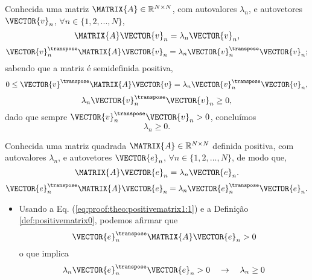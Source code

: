 \begin{myproofT}\label{proof:theo:semipositivematrix2}
Conhecida uma matriz $\MATRIX{A} \in \mathbb{R}^{N \times N}$, com  autovalores $\lambda_n$,
e autovetores $\VECTOR{v}_n$, $\forall n \in \{1, 2, ..., N\}$,
\begin{equation}
\MATRIX{A}\VECTOR{v}_n = \lambda_n \VECTOR{v}_n, 
\end{equation}
\begin{equation}
\VECTOR{v}_n^{\transpose}\MATRIX{A}\VECTOR{v}_n = \lambda_n \VECTOR{v}_n^{\transpose}\VECTOR{v}_n;
\end{equation}
sabendo que a matriz é semidefinida positiva,
\begin{equation}
0 \leq \VECTOR{v}^{\transpose}\MATRIX{A}\VECTOR{v} = \lambda_n \VECTOR{v}_n^{\transpose}\VECTOR{v}_n,
\end{equation}
\begin{equation}
\lambda_n \VECTOR{v}_n^{\transpose}\VECTOR{v}_n \geq 0,
\end{equation}
dado que sempre $\VECTOR{v}_n^{\transpose}\VECTOR{v}_n> 0$, concluímos
\begin{equation}
\lambda_n  \geq 0.
\end{equation} 
\end{myproofT}

\begin{myproofT}\label{proof:theo:positivematrix1}
Conhecida uma matriz quadrada $\MATRIX{A} \in \mathbb{R}^{N \times N}$ definida positiva, com  autovalores $\lambda_n$,
e autovetores $\VECTOR{e}_n$, $\forall n \in \{1, 2, ..., N\}$, de modo que,
\begin{equation}\label{eq:proof:theo:positivematrix1:0}
\MATRIX{A}\VECTOR{e}_n=\lambda_n \VECTOR{e}_n.
\end{equation}
\begin{equation}\label{eq:proof:theo:positivematrix1:1}
\VECTOR{e}_n^{\transpose}\MATRIX{A}\VECTOR{e}_n=\lambda_n \VECTOR{e}_n^{\transpose}\VECTOR{e}_n.
\end{equation}

\begin{itemize}
\item Usando a Eq. (\ref{eq:proof:theo:positivematrix1:1}) e a 
Definição \ref{def:positivematrix0}, podemos afirmar que
\begin{equation}
\VECTOR{e}_n^{\transpose}\MATRIX{A}\VECTOR{e}_n >0
\end{equation} 
o que implica
\begin{equation}
\lambda_n \VECTOR{e}_n^{\transpose}\VECTOR{e}_n > 0
\quad \rightarrow \quad
\lambda_n  \geq 0
\end{equation} 
\end{itemize}
\end{myproofT}


